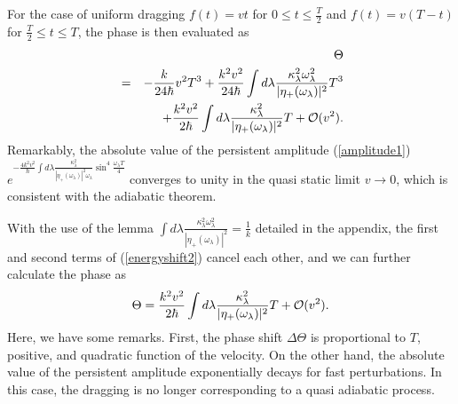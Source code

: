 \documentclass[aps,pre,twocolumn,eqsecnum,showpacs,superscriptaddress]{revtex4}
\begin{document}
For the case of uniform dragging $f(t)=vt$ for $0\leq t\leq \frac{T}{2}$ and $f(t)=v(T-t)$ for $\frac{T}{2}\leq t\leq T$, the phase is then evaluated as
\begin{eqnarray}
&&\Theta \nonumber \\
&=&-\frac{k}{24\hbar}v^2 T^3+\frac{k^2v^2}{24\hbar}\int d\lambda\frac{\kappa_\lambda^2\omega_\lambda^2}{|\eta_+(\omega_\lambda)|^2}T^3 \nonumber \\
&&+\frac{k^2v^2}{2\hbar}\int d\lambda\frac{\kappa_\lambda^2}{|\eta_+(\omega_\lambda)|^2}T+{\cal O}(v^2). \label{energyshift2} 
\end{eqnarray}   
Remarkably, the absolute value of the persistent amplitude (\ref{amplitude1}) $e^{-\frac{4k^2 v^2}{\hbar}\int d\lambda\frac{\kappa_\lambda^2}{|\eta_+(\omega_\lambda)|^2\omega_\lambda}\sin^4\frac{\omega_\lambda T}{4}}$%
 converges to unity in the quasi static limit $v\rightarrow 0$, which is consistent with the adiabatic theorem.  

With the use of the lemma $\int d\lambda\frac{\kappa_\lambda^2\omega_\lambda^2}{|\eta_+(\omega_\lambda)|^2}=\frac{1}{k}$ detailed in the appendix, the first and second terms of (\ref{energyshift2}) cancel each other, and we can further calculate the phase as
\begin{equation}
\Theta=\frac{k^2v^2}{2\hbar}\int d\lambda\frac{\kappa_\lambda^2}{|\eta_+(\omega_\lambda)|^2}T+{\cal O}(v^2). \label{energyshift3}
\end{equation}
Here, we have some remarks.   
First, the phase shift $\Delta \Theta$ is proportional to $T$, positive, 
and quadratic function of the velocity.
On the other hand, the absolute value of the persistent amplitude exponentially decays for fast perturbations.
In this case, the dragging is no longer corresponding to a quasi adiabatic process.
\end{document}
